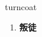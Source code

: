 
\begin{frame}
{\huge turncoat}
\begin{center}
\begin{enumerate}\Large
  \item \textbf{叛徒}
\end{enumerate}
\end{center}
\end{frame}
